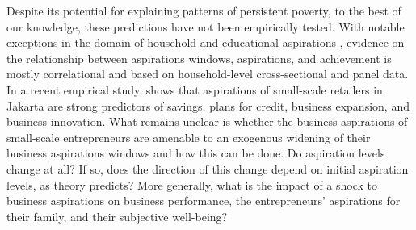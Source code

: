 \documentclass[11.5pt]{article}
\begin{document}




Despite its potential for explaining patterns of persistent poverty, to the best of our knowledge, these predictions have not been empirically tested. With notable exceptions in the domain of household and educational aspirations \citep[see,][]{Bernard2014, Riley2017, Macours2014, Beaman2012}, evidence on the relationship between aspirations windows, aspirations, and achievement is mostly correlational and based on household-level cross-sectional and panel data. In a recent empirical study, \citep{Dalton2018} shows that aspirations of small-scale retailers in Jakarta are strong predictors of savings, plans for credit, business expansion, and business innovation. What remains unclear is whether the business aspirations of small-scale entrepreneurs are amenable to an exogenous widening of their business aspirations windows and how this can be done. Do aspiration levels change at all? If so, does the direction of this change depend on initial aspiration levels, as theory predicts? More generally, what is the impact of a shock to business aspirations on business performance, the entrepreneurs' aspirations for their family, and their subjective well-being? %
\end{document}
